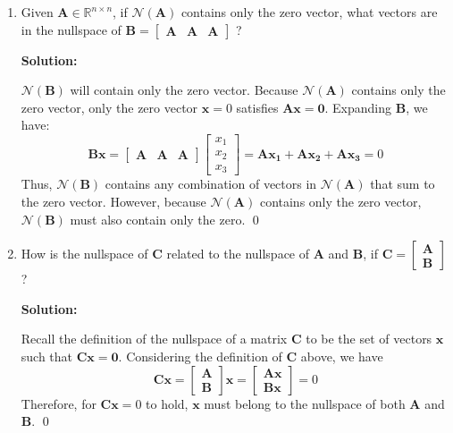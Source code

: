 \begin{enumerate}[label=(\alph*)]
	\item Given $\mathbf{A} \in \mathbb{R}^{n \times n}$, if
	      $\mathcal{N}(\mathbf{A})$ contains only the zero vector, what vectors
	      are in the nullspace of $\mathbf{B}=\left[\begin{array}{lll}
				      \mathbf{A} & \mathbf{A} & \mathbf{A}
			      \end{array}\right]$ ?

	      \par \textbf{Solution:}
	      \par $\mathcal{N}(\mathbf{B})$ will contain only
	      the zero vector. Because $\mathcal{N}(\mathbf{A})$ contains
	      only the zero vector, only the zero vector $\mathbf{x} = 0$ satisfies
	      $\mathbf{A}\mathbf{x} = \mathbf{0}$. Expanding $\mathbf{B}$, we have:
	      $$
		      \mathbf{Bx} =
		      \left[\begin{array}{lll}
				      \mathbf{A} &
				      \mathbf{A} &
				      \mathbf{A}
			      \end{array}\right]
		      \left[\begin{array}{l}
				      x_1 \\
				      x_2 \\
				      x_3
			      \end{array}\right] =
		      \mathbf{Ax_1} +
		      \mathbf{Ax_2} +
		      \mathbf{Ax_3} = 0
	      $$
	      Thus, $\mathcal{N}(\mathbf{B})$ contains any combination of
	      vectors in $\mathcal{N}(\mathbf{A})$ that sum to the zero vector.
	      However, because $\mathcal{N}(\mathbf{A})$ contains only the zero
	      vector, $\mathcal{N}(\mathbf{B})$ must also contain only the zero.
	      \qed

	\item How is the nullspace of $\mathbf{C}$ related to the nullspace of
	      $\mathbf{A}$ and $\mathbf{B}$, if $\mathbf{C}=\left[\begin{array}{l}
				      \mathbf{A} \\
				      \mathbf{B}
			      \end{array}\right]$?

	      \par \textbf{Solution:}
	      \par Recall the definition of the nullspace of a
	      matrix $\mathbf{C}$ to be the set of vectors $\mathbf{x}$ such that
	      $\mathbf{Cx} = \mathbf{0}$. Considering the definition of $\mathbf{C}$
	      above, we have
	      $$
		      \mathbf{Cx} =
		      \left[\begin{array}{l}
				      \mathbf{A} \\
				      \mathbf{B}
			      \end{array}\right]
		      \mathbf{x} =
		      \left[\begin{array}{l}
				      \mathbf{Ax} \\
				      \mathbf{Bx}
			      \end{array}\right] = 0
	      $$
	      Therefore, for $\mathbf{Cx} = 0$ to hold, $\mathbf{x}$ must belong to
	      the nullspace of both $\mathbf{A}$ and $\mathbf{B}$.
	      \qed

\end{enumerate}
